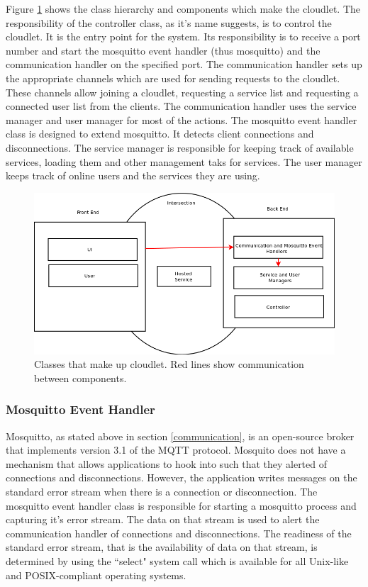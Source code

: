 Figure \ref{fig:objstruc} shows the class hierarchy and components which make the cloudlet. The responsibility of the controller class, as it's name suggests, is to control the cloudlet. It is the entry point for the system.
Its responsibility is to receive a port number and start the mosquitto event handler (thus mosquitto) and the communication handler on the specified port. The communication handler sets up the appropriate channels which are
used for sending requests to the cloudlet. These channels allow joining a cloudlet, requesting a service list  and requesting a connected user list from the clients. The communication handler uses the service manager and
user manager for most of the actions. The mosquitto event handler class is designed to extend mosquitto. It detects client connections and disconnections. The service manager is responsible for keeping track of available
services, loading them and other management taks for services. The user manager keeps track of online users and the services they are using.

\begin{figure}
\includegraphics[scale=0.4]{figures/newcomponentstructure}
\caption{Classes that make up cloudlet. Red lines show communication between components.}
\label{fig:objstruc}
\end{figure}

\subsubsection{Mosquitto Event Handler}
Mosquitto, as stated above in section \ref{communication}, is an open-source broker that implements version 3.1 of the MQTT protocol. Mosquito does not have a mechanism that allows applications to hook into such that they alerted of connections and disconnections. However, the application writes messages on the standard error stream when there is a connection or disconnection. The mosquitto event handler class is responsible for starting a mosquitto process and
capturing it's error stream. The data on that stream is used to alert the communication handler of connections and disconnections. The readiness of the standard error stream, that is the availability of data on that
stream, is determined by using the ``select" system call which is available for all Unix-like and POSIX-compliant operating systems.


